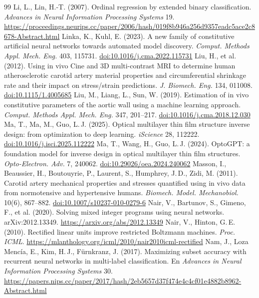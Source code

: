 \begin{thebibliography}{99}
 Li, L., Lin, H.-T. (2007). Ordinal regression by extended binary classification. \emph{Advances in Neural Information Processing Systems} 19. \url{https://proceedings.neurips.cc/paper/2006/hash/019f8b946a256d9357eadc5ace2c8678-Abstract.html}
 Linka, K., Kuhl, E. (2023). A new family of constitutive artificial neural networks towards automated model discovery. \emph{Comput. Methods Appl. Mech. Eng.} 403, 115731. \href{https://doi.org/10.1016/j.cma.2022.115731}{doi:10.1016/j.cma.2022.115731}
 Liu, H., et al. (2012). Using in vivo Cine and 3D multi-contrast MRI to determine human atherosclerotic carotid artery material properties and circumferential shrinkage rate and their impact on stress/strain predictions. \emph{J. Biomech. Eng.} 134, 011008. \href{https://doi.org/10.1115/1.4005685}{doi:10.1115/1.4005685}
 Liu, M., Liang, L., Sun, W. (2019). Estimation of in vivo constitutive parameters of the aortic wall using a machine learning approach. \emph{Comput. Methods Appl. Mech. Eng.} 347, 201--217. \href{https://doi.org/10.1016/j.cma.2018.12.030}{doi:10.1016/j.cma.2018.12.030}
 Ma, T., Ma, M., Guo, L.\,J. (2025). Optical multilayer thin film structure inverse design: from optimization to deep learning. \emph{iScience} 28, 112222. \href{https://doi.org/10.1016/j.isci.2025.112222}{doi:10.1016/j.isci.2025.112222}
 Ma, T., Wang, H., Guo, L.\,J. (2024). OptoGPT: a foundation model for inverse design in optical multilayer thin film structures. \emph{Opto-Electron. Adv.} 7, 240062. \href{https://doi.org/10.29026/oea.2024.240062}{doi:10.29026/oea.2024.240062}
 Masson, I., Beaussier, H., Boutouyrie, P., Laurent, S., Humphrey, J.\,D., Zidi, M. (2011). Carotid artery mechanical properties and stresses quantified using in vivo data from normotensive and hypertensive humans. \emph{Biomech. Model. Mechanobiol.} 10(6), 867--882. \href{https://doi.org/10.1007/s10237-010-0279-6}{doi:10.1007/s10237-010-0279-6}
 Nair, V., Bartunov, S., Gimeno, F., et al. (2020). Solving mixed integer programs using neural networks. arXiv:2012.13349. \url{https://arxiv.org/abs/2012.13349}
 Nair, V., Hinton, G.\,E. (2010). Rectified linear units improve restricted Boltzmann machines. \emph{Proc. ICML}. \url{https://mlanthology.org/icml/2010/nair2010icml-rectified}
 Nam, J., Loza Mencía, E., Kim, H.\,J., Fürnkranz, J. (2017). Maximizing subset accuracy with recurrent neural networks in multi-label classification. En \emph{Advances in Neural Information Processing Systems} 30. \url{https://papers.nips.cc/paper/2017/hash/2eb5657d37f474e4c4cf01e4882b8962-Abstract.html}

\end{thebibliography}

